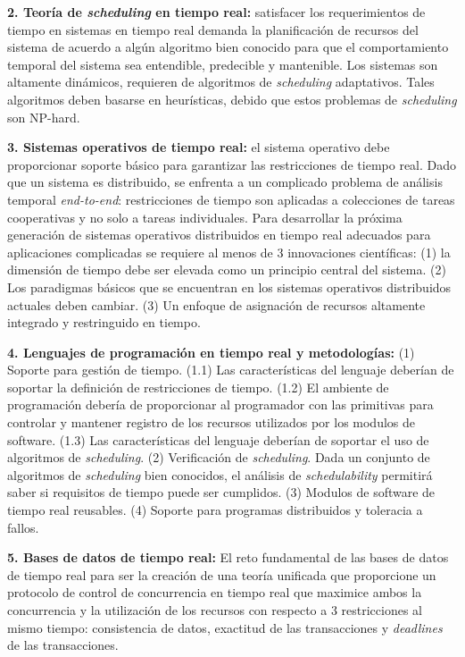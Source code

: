 \textbf{2. Teoría de \emph{scheduling} en tiempo real:} satisfacer los requerimientos de tiempo en sistemas en tiempo real demanda la planificación de recursos del sistema de acuerdo a algún algoritmo bien conocido para que el comportamiento temporal del sistema sea entendible, predecible y mantenible. Los sistemas son altamente dinámicos, requieren de algoritmos de \emph{scheduling} adaptativos. Tales algoritmos deben basarse en heurísticas, debido que estos problemas de \emph{scheduling} son NP-hard. 

\textbf{3. Sistemas operativos de tiempo real:} el sistema operativo debe proporcionar soporte básico para garantizar las restricciones de tiempo real. Dado que un sistema es distribuido, se enfrenta a un complicado problema de análisis temporal \emph{end-to-end}: restricciones de tiempo son aplicadas a colecciones de tareas cooperativas y no solo a tareas individuales. Para desarrollar la próxima generación de sistemas operativos distribuidos en tiempo real adecuados para aplicaciones complicadas se requiere al menos de 3 innovaciones científicas: (1) la dimensión de tiempo debe ser elevada como un principio central del sistema. (2) Los paradigmas básicos que se encuentran en los sistemas operativos distribuidos actuales deben cambiar. (3) Un enfoque de asignación de recursos altamente integrado y restringuido en tiempo. 

\textbf{4. Lenguajes de programación en tiempo real y metodologías:} (1) Soporte para gestión de tiempo. (1.1) Las características del lenguaje deberían de soportar la definición de restricciones de tiempo. (1.2) El ambiente de programación debería de proporcionar al programador con las primitivas para controlar y mantener registro de los recursos utilizados por los modulos de software. (1.3) Las características del lenguaje deberían de soportar el uso de algoritmos de \emph{scheduling}. (2) Verificación de \emph{scheduling}. Dada un conjunto de algoritmos de \emph{scheduling} bien conocidos, el análisis de \emph{schedulability} permitirá saber si requisitos de tiempo puede ser cumplidos. (3) Modulos de software de tiempo real reusables. (4) Soporte para programas distribuidos y toleracia a fallos. 

\textbf{5. Bases de datos de tiempo real:} El reto fundamental de las bases de datos de tiempo real para ser la creación de una teoría unificada que proporcione un protocolo de control de concurrencia en tiempo real que maximice ambos la concurrencia y la utilización de los recursos con respecto a 3 restricciones al mismo tiempo: consistencia de datos, exactitud de las transacciones y \emph{deadlines} de las transacciones. 

